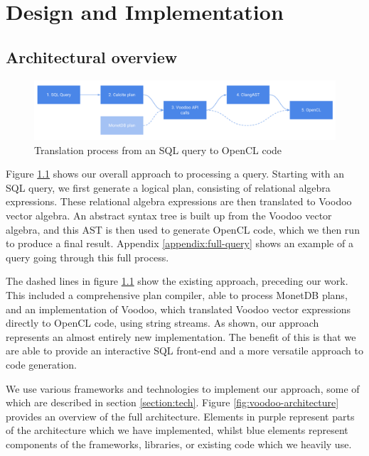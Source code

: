 \chapter{Design and Implementation}

\section{Architectural overview}

\begin{figure}[H]
\includegraphics[width=\linewidth]{design-and-implementation/representations.pdf}
\centering
\caption{Translation process from an SQL query to OpenCL code}
\label{fig:translation-process}
\end{figure}

Figure \ref{fig:translation-process} shows our overall approach to processing a query. Starting with an SQL query, we first generate a logical plan, consisting of relational algebra expressions. These relational algebra expressions are then translated to Voodoo vector algebra. An abstract syntax tree is built up from the Voodoo vector algebra, and this AST is then used to generate OpenCL code, which we then run to produce a final result. Appendix \ref{appendix:full-query} shows an example of a query going through this full process.

The dashed lines in figure \ref{fig:translation-process} show the existing approach, preceding our work. This included a comprehensive plan compiler, able to process MonetDB plans, and an implementation of Voodoo, which translated Voodoo vector expressions directly to OpenCL code, using string streams. As shown, our approach represents an almost entirely new implementation. The benefit of this is that we are able to provide an interactive SQL front-end and a more versatile approach to code generation.

We use various frameworks and technologies to implement our approach, some of which are described in section \ref{section:tech}. Figure \ref{fig:voodoo-architecture} provides an overview of the full architecture. Elements in purple represent parts of the architecture which we have implemented, whilst blue elements represent components of the frameworks, libraries, or existing code which we heavily use.


